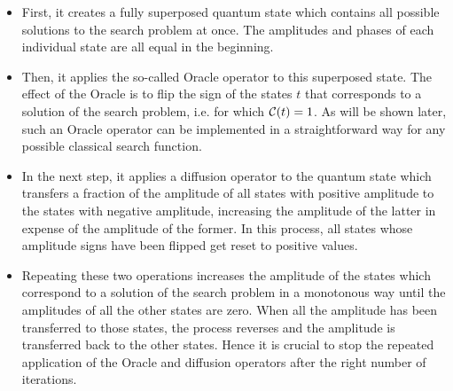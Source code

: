 \begin{itemize}
\item First, it creates a fully superposed quantum state which contains all possible solutions to the search problem at once. The amplitudes and phases of each individual state are all equal in the beginning.
\item Then, it applies the so-called Oracle operator to this superposed state. The effect of the Oracle is to flip the sign of the states $t$ that corresponds to a solution of the search problem, i.e. for which $\Or(t)=1$. As will be shown later, such an Oracle operator can be implemented in a straightforward way for any possible classical search function.
\item In the next step, it applies a diffusion operator to the quantum state which transfers a fraction of the amplitude of all states with positive amplitude to the states with negative amplitude, increasing the amplitude of the latter in expense of the amplitude of the former. In this process, all states whose amplitude signs have been flipped get reset to positive values.
\item Repeating these two operations increases the amplitude of the states which correspond to a solution of the search problem in a monotonous way until the amplitudes of all the other states are zero. When all the amplitude has been transferred to those states, the process reverses and the amplitude is transferred back to the other states. Hence it is crucial to stop the repeated application of the Oracle and diffusion operators after the right number of iterations.
\end{itemize}

